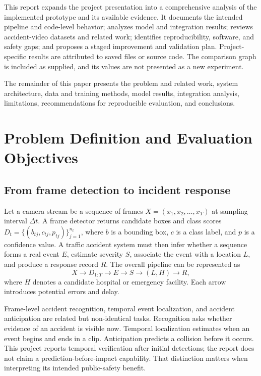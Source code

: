 \documentclass[12pt,a4paper]{article}
\begin{document}
This report expands the project presentation into a comprehensive analysis of the implemented prototype and its available evidence. It documents the intended pipeline and code-level behavior; analyzes model and integration results; reviews accident-video datasets and related work; identifies reproducibility, software, and safety gaps; and proposes a staged improvement and validation plan. Project-specific results are attributed to saved files or source code. The comparison graph is included as supplied, and its values are not presented as a new experiment.

The remainder of this paper presents the problem and related work, system architecture, data and training methods, model results, integration analysis, limitations, recommendations for reproducible evaluation, and conclusions.

\section{Problem Definition and Evaluation Objectives}
\subsection{From frame detection to incident response}
Let a camera stream be a sequence of frames $X=(x_1,x_2,\ldots,x_T)$ at sampling interval $\Delta t$. A frame detector returns candidate boxes and class scores $D_t=\{(b_{tj},c_{tj},p_{tj})\}_{j=1}^{n_t}$, where $b$ is a bounding box, $c$ is a class label, and $p$ is a confidence value. A traffic accident system must then infer whether a sequence forms a real event $E$, estimate severity $S$, associate the event with a location $L$, and produce a response record $R$. The overall pipeline can be represented as
\begin{equation}
X \rightarrow D_{1:T} \rightarrow E \rightarrow S \rightarrow (L,H) \rightarrow R,
\end{equation}
where $H$ denotes a candidate hospital or emergency facility. Each arrow introduces potential errors and delay.

Frame-level accident recognition, temporal event localization, and accident anticipation are related but non-identical tasks. Recognition asks whether evidence of an accident is visible now. Temporal localization estimates when an event begins and ends in a clip. Anticipation predicts a collision before it occurs. This project reports temporal verification after initial detections; the report does not claim a prediction-before-impact capability. That distinction matters when interpreting its intended public-safety benefit.
\end{document}

